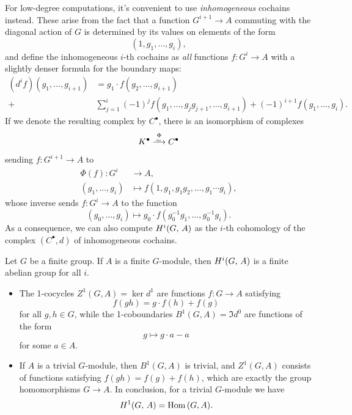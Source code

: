 \documentclass[a4paper, oneside]{memoir}
\begin{document}
For low-degree computations, it's convenient to use \textit{inhomogeneous} cochains instead. These arise from the fact that a function $G^{i+1}\to A$ commuting with the diagonal action of $G$ is determined by its values on elements of the form \[(1,g_1,\dots , g_i),\] and define the inhomogeneous $i$-th cochains as \textit{all} functions $f: G^i\to A$ with a slightly denser formula for the boundary maps:
\begin{equation}\label{eq:Coboundary}
	\begin{aligned}
		(d^i f)(g_1,\dots , g_{i+1}) & =g_1\cdot f(g_2,\dots , g_{i+1})                                                                \\
		+                            & \sum_{j=1}^{i} (-1)^j f(g_1,\dots , g_j g_{j+1},\dots , g_{i+1})+(-1)^{i+1} f(g_1,\dots , g_i).
	\end{aligned}
\end{equation}
If we denote the resulting complex by $C^\bullet$, there is an isomorphism of complexes
\[
	K^\bullet\overset{\Phi}{\Iso} C^\bullet
\]
sending $f: G^{i+1}\to A$ to
\begin{align*}
	\Phi(f): G^i      & \to A,                                            \\
	(g_1,\dots , g_i) & \mapsto f(1,g_1, g_1 g_2, \dots , g_1\cdots g_i),
\end{align*}
whose inverse sends $f: G^i\to A$ to the function
\[
	(g_0,\dots , g_i)\mapsto g_0\cdot f(g_0^{-1}g_1,\dots , g_0^{-1}g_i).
\]
As a consequence, we can also compute $H^{i}( G, \, A )$ as the $i$-th cohomology of the complex $(C^\bullet, d)$ of inhomogeneous cochains.

\begin{corollary}
	Let $G$ be a finite group. If $A$ is a finite $G$-module, then $H^{i}( G, \, A )$ is a finite abelian group for all $i$.
\end{corollary}
\begin{example}
	\noindent
	\begin{itemize}
		\item The 1-cocycles $Z^1(G,A)=\ker{d^1}$ are functions $f: G\to A$ satisfying \[f(gh)=g\cdot f(h)+f(g)\] for all $g,h\in G$, while the 1-coboundaries $B^1(G,A)=\Im{d^0}$ are functions of the form \[g\mapsto g\cdot a-a\] for some $a\in A$.
		\item\label{ex:TrivialModH1} If $A$ is a trivial $G$-module, then $B^1(G,A)$ is trivial, and $Z^1(G,A)$ consists of functions satisfying $f(gh)=f(g)+f(h)$, which are exactly the group homomorphisms $G\to A$. In conclusion, for a trivial $G$-module we have \[H^{1}( G, \, A )=\operatorname{Hom}{(G,A)}.\]
	\end{itemize}
\end{example}
\end{document}
